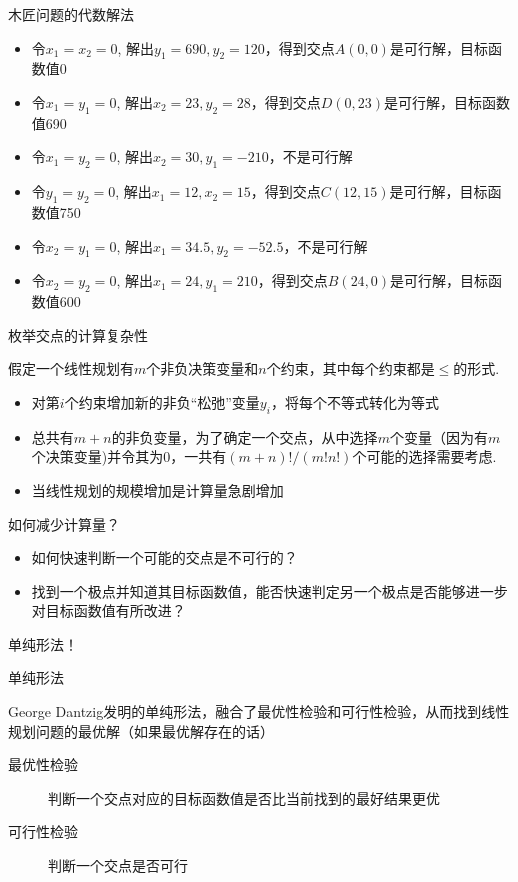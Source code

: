 \documentclass[UTF8]{ctexbeamer}
\begin{document}
\begin{frame}{木匠问题的代数解法}
  \begin{itemize}
  \item 令$x_1 = x_2 = 0$, 解出$y_1 = 690, y_2 = 120$，得到交点$A(0,0)$是可行解，目标函数值0
  \item 令$x_1 = y_1 = 0$, 解出$x_2 = 23, y_2 = 28$，得到交点$D(0,23)$是可行解，目标函数值690
  \item 令$x_1 = y_2 = 0$, 解出$x_2 = 30, y_1 = -210$，不是可行解
  \item 令$y_1 = y_2 = 0$, 解出$x_1 = 12, x_2 = 15$，得到交点$C(12,15)$是可行解，目标函数值750
  \item 令$x_2 = y_1 = 0$, 解出$x_1 = 34.5, y_2 = -52.5$，不是可行解
  \item 令$x_2 = y_2 = 0$, 解出$x_1 = 24, y_1 = 210$，得到交点$B(24,0)$是可行解，目标函数值600
  \end{itemize}
  
\end{frame}

\begin{frame}{枚举交点的计算复杂性}

  假定一个线性规划有$m$个非负决策变量和$n$个约束，其中每个约束都是$\le$的形式.
  \begin{itemize}
  \item 对第$i$个约束增加新的非负``松弛''变量$y_i$，将每个不等式转化为等式
  \item 总共有$m+n$的非负变量，为了确定一个交点，从中选择$m$个变量（因为有$m$个决策变量)并令其为0，一共有$(m+n)!/(m!n!)$个可能的选择需要考虑.
  \item 当线性规划的规模增加是计算量急剧增加
  \end{itemize}
  
\end{frame}

\begin{frame}{如何减少计算量？}

  \begin{itemize}
  \item 如何快速判断一个可能的交点是不可行的？
  \item 找到一个极点并知道其目标函数值，能否快速判定另一个极点是否能够进一步对目标函数值有所改进？
  \end{itemize}

  单纯形法！
  
\end{frame}

\begin{frame}{单纯形法}
  \begin{block}{}
    George Dantzig发明的单纯形法，融合了最优性检验和可行性检验，从而找到线性规划问题的最优解（如果最优解存在的话）
  \end{block}

  \begin{description}
  \item[最优性检验] 判断一个交点对应的目标函数值是否比当前找到的最好结果更优
  \item[可行性检验] 判断一个交点是否可行
  \end{description}

\end{frame}
\end{document}
